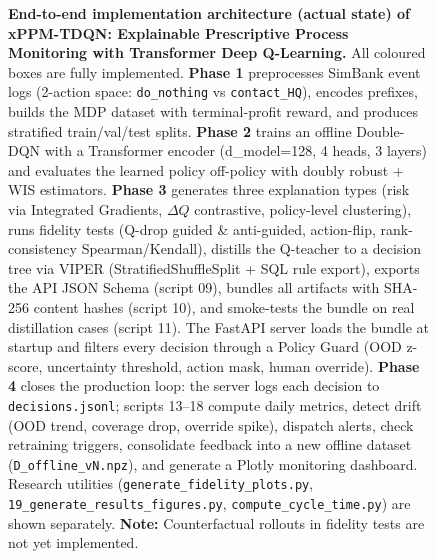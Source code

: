 \documentclass{article}
\begin{document}
\begin{figure}[H]
{
  }

  \caption{
\textbf{End-to-end implementation architecture (actual state) of xPPM-TDQN:
Explainable Prescriptive Process Monitoring with Transformer Deep Q-Learning.}
All coloured boxes are fully implemented.
\textbf{Phase 1} preprocesses SimBank event logs (2-action space:
\texttt{do\_nothing} vs \texttt{contact\_HQ}),
encodes prefixes, builds the MDP dataset with terminal-profit reward,
and produces stratified train/val/test splits.
\textbf{Phase 2} trains an offline Double-DQN with a Transformer encoder
(d\_model=128, 4 heads, 3 layers) and evaluates the learned policy
off-policy with doubly robust + WIS estimators.
\textbf{Phase 3} generates three explanation types
(risk via Integrated Gradients, $\Delta Q$ contrastive, policy-level clustering),
runs fidelity tests (Q-drop guided \& anti-guided, action-flip, rank-consistency
Spearman/Kendall),
distills the Q-teacher to a decision tree via VIPER
(StratifiedShuffleSplit + SQL rule export),
exports the API JSON Schema (script 09),
bundles all artifacts with SHA-256 content hashes (script 10),
and smoke-tests the bundle on real distillation cases (script 11).
The FastAPI server loads the bundle at startup and filters every decision
through a Policy Guard (OOD z-score, uncertainty threshold, action mask, human override).
\textbf{Phase 4} closes the production loop: the server logs each decision to
\texttt{decisions.jsonl}; scripts 13--18 compute daily metrics,
detect drift (OOD trend, coverage drop, override spike), dispatch alerts,
check retraining triggers, consolidate feedback into a new offline dataset
(\texttt{D\_offline\_vN.npz}), and generate a Plotly monitoring dashboard.
Research utilities (\texttt{generate\_fidelity\_plots.py},
\texttt{19\_generate\_results\_figures.py},
\texttt{compute\_cycle\_time.py}) are shown separately.
\textbf{Note:} Counterfactual rollouts in fidelity tests are not yet implemented.
  }
  \label{fig:code_architecture_actual}
\end{figure}
\end{document}
